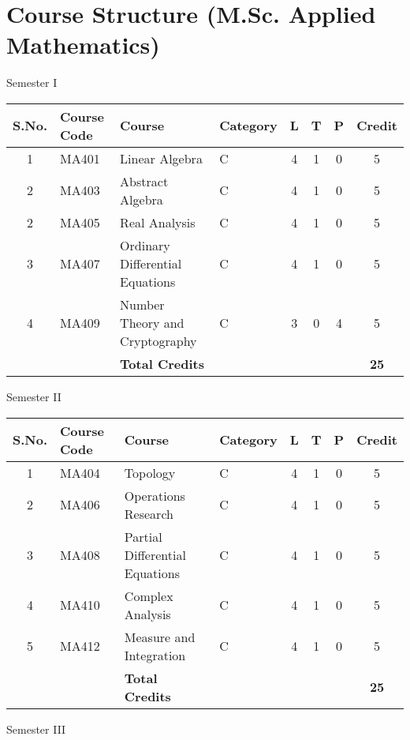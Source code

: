 \section{Course Structure (M.Sc. Applied Mathematics)}
\begin{center}
{\Large Semester I}
\begin{tabular}{|c |p{0.7in}| p{3in}|p{0.7in}|c|c|c|c|}
                \hline
                S.No.   & Course Code   & Course  & Category       & L & T & P & Credit\\
 \hline
 1 &     MA401 & Linear Algebra &C  & 4 & 1 & 0 &5\\
 \hline
 2       & MA403 & Abstract Algebra &C & 4 & 1 & 0 &5\\
                \hline
 2       & MA405 & Real Analysis&C & 4 & 1 & 0 &5\\
   \hline
 3       & MA407 & Ordinary  Differential Equations&C       & 4 &1 &0&5\\
                \hline
4       & MA409 & Number Theory and Cryptography&C    & 3 & 0 & 4 & 5\\
\hline
&  &\textbf{Total Credits} & & &  & &\textbf{25}\\
\hline
\end{tabular}
{\Large Semester II}

\begin{tabular}{|c |p{0.7in}| p{3in}|p{0.7in}|c|c|c|c|}
\hline
S.No.   & Course Code   & Course & Category        & L & T & P & Credit\\
\hline
1 &     MA404 & Topology & C        & 4 & 1 & 0 &5\\
   \hline
2       & MA406 & Operations Research & C  & 4 & 1 & 0 &5\\
   \hline
3       & MA408 & Partial Differential Equations & C  & 4 & 1 & 0 &5\\
                \hline
4       & MA410 & Complex Analysis & C  & 4 & 1 & 0 &5\\
\hline
5       & MA412 &Measure and Integration & C &    4&1& 0 &5\\
\hline
&  &\textbf{Total Credits} & & & & &\textbf{25}\\
\hline
\end{tabular}

{\Large Semester III}


\end{center}
